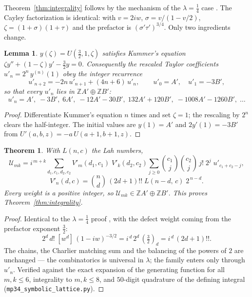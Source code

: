 \documentclass[11pt,a4paper]{article}
\newtheorem{theorem}{Theorem}[section]
\newtheorem{lemma}{Lemma}[section]
\newcommand{\Z}{\mathbb{Z}}
\begin{document}
Theorem~\ref{thm:integrality} follows by the mechanism of the
$\lambda = \tfrac14$ case \cite{mp14}. The Cayley factorization is
identical: with $v = 2iw$, $\sigma = v/(1-v/2)$,
$\zeta = (1+\sigma)(1+\tau)$ and the prefactor is
$(\sigma'\tau')^{3/4}$. Only two ingredients change.

\begin{lemma}\label{lem:kummer}
$y(\zeta) = U(\tfrac32, 1, \zeta)$ satisfies Kummer's equation
$\zeta y'' + (1-\zeta) y' - \tfrac32 y = 0$. Consequently the
rescaled Taylor coefficients $u'_n = 2^n\, y^{(n)}(1)$ obey the
integer recurrence
\[
  u'_{n+2} = -2n\, u'_{n+1} + (4n+6)\, u'_n,
  \qquad u'_0 = A', \quad u'_1 = -3B',
\]
so that every $u'_n$ lies in $\Z A' \oplus \Z B'$:
\[
  u'_n = A',\; -3B',\; 6A',\; -12A'-30B',\; 132A'+120B',\;
  -1008A'-1260B',\; \ldots
\]
\end{lemma}

\begin{proof}
Differentiate Kummer's equation $n$ times and set $\zeta = 1$; the
rescaling by $2^n$ clears the half-integer. The initial values are
$y(1) = A'$ and $2y'(1) = -3B'$ from $U'(a,b,z) = -a\,U(a{+}1,b{+}1,z)$.
\end{proof}

\begin{theorem}\label{thm:formula}
With $L(n,c)$ the Lah numbers,
\[
  \mathcal{U}_{mk} = i^{\,m+k} \sum_{d_1, c_1, d_2, c_2}
  V'_m(d_1, c_1)\; V'_k(d_2, c_2)
  \sum_{j \ge 0} \binom{c_1}{j} \binom{c_2}{j}\, j!\; 2^j\;
  u'_{c_1 + c_2 - j},
\]
\[
  V'_n(d, c) = \binom{n}{d}\, (2d+1)!!\; L(n-d,\, c)\; 2^{\,n-d}.
\]
Every weight is a positive integer, so
$\mathcal{U}_{mk} \in \Z A' \oplus \Z B'$. This proves
Theorem~\ref{thm:integrality}.
\end{theorem}

\begin{proof}
Identical to the $\lambda = \tfrac14$ proof \cite{mp14}, with the
defect weight coming from the prefactor exponent $\tfrac32$:
\[
  2^d\, d!\; [w^d]\, (1-iw)^{-3/2} = i^{\,d}\, 2^d\, (\tfrac32)_d
  = i^{\,d}\, (2d+1)!!.
\]
The chains, the Charlier matching sum and the balancing of the powers
of $2$ are unchanged --- the combinatorics is universal in $\lambda$;
the family enters only through $u'_n$. Verified against the exact
expansion of the generating function for all $m,k \le 6$, integrality
to $m,k \le 8$, and $50$-digit quadrature of the defining integral
(\texttt{mp34\_symbolic\_lattice.py}).
\end{proof}
\end{document}
